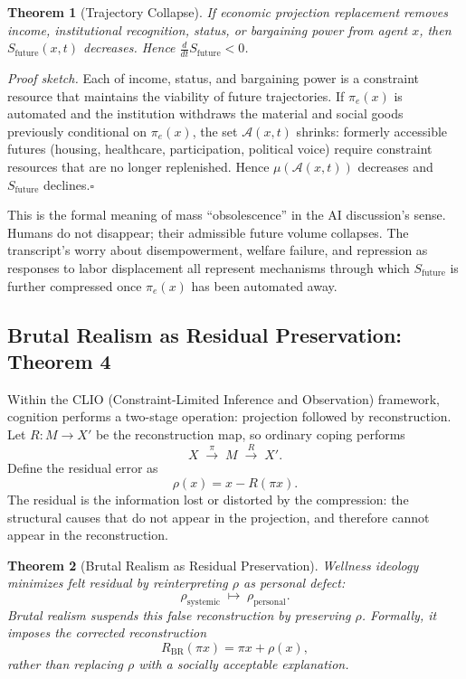 \documentclass[12pt, a4paper]{article}
\theoremstyle{plain}
\newtheorem{theorem}{Theorem}
\theoremstyle{definition}
\theoremstyle{remark}
\begin{document}
\begin{theorem}[Trajectory Collapse]
If economic projection replacement removes income, institutional recognition,
status, or bargaining power from agent $x$, then $S_{\mathrm{future}}(x,t)$
decreases. Hence $\tfrac{d}{dt}S_{\mathrm{future}} < 0$.
\end{theorem}

\textit{Proof sketch.}
Each of income, status, and bargaining power is a constraint resource that
maintains the viability of future trajectories.
If $\pi_e(x)$ is automated and the institution withdraws the material and
social goods previously conditional on $\pi_e(x)$, the set $\mathcal{A}(x,t)$
shrinks: formerly accessible futures (housing, healthcare, participation,
political voice) require constraint resources that are no longer replenished.
Hence $\mu(\mathcal{A}(x,t))$ decreases and $S_{\mathrm{future}}$ declines.\hfill$\square$

This is the formal meaning of mass ``obsolescence'' in the AI discussion's sense.
Humans do not disappear; their admissible future volume collapses.
The transcript's worry about disempowerment, welfare failure, and repression as
responses to labor displacement all represent mechanisms through which
$S_{\mathrm{future}}$ is further compressed once $\pi_e(x)$ has been automated away.

\subsection{Brutal Realism as Residual Preservation: Theorem 4}

Within the CLIO (Constraint-Limited Inference and Observation) framework,
cognition performs a two-stage operation: projection followed by reconstruction.
Let $R : M \to X'$ be the reconstruction map, so ordinary coping performs
\[
X \;\xrightarrow{\pi}\; M \;\xrightarrow{R}\; X'.
\]
Define the residual error as
\[
\rho(x) = x - R(\pi x).
\]
The residual is the information lost or distorted by the compression: the structural
causes that do not appear in the projection, and therefore cannot appear in the
reconstruction.

\begin{theorem}[Brutal Realism as Residual Preservation]
Wellness ideology minimizes felt residual by reinterpreting $\rho$ as personal defect:
\[
\rho_{\mathrm{systemic}} \;\mapsto\; \rho_{\mathrm{personal}}.
\]
Brutal realism suspends this false reconstruction by preserving $\rho$.
Formally, it imposes the corrected reconstruction
\[
R_{\mathrm{BR}}(\pi x) = \pi x + \rho(x),
\]
rather than replacing $\rho$ with a socially acceptable explanation.
\end{theorem}
\end{document}
